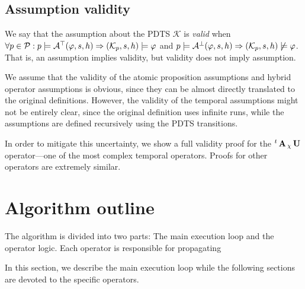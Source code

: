 \subsection{Assumption validity}

We say that the assumption about the \ac{PDTS} $\mathcal{K}$ is \emph{valid} when $\forall p \in \mathcal{P} : p \models \mathcal{A}^\top(\varphi, s, h) \Rightarrow (\mathcal{K}_p, s, h) \models \varphi$ and $ p \models \mathcal{A}^\bot(\varphi, s, h) \Rightarrow (\mathcal{K}_p, s, h) \not\models \varphi$. That is, an assumption implies validity, but validity does not imply assumption.

We assume that the validity of the atomic proposition assumptions and hybrid operator assumptions is obvious, since they can be almost directly translated to the original definitions. However, the validity of the temporal assumptions might not be entirely clear, since the original definition uses infinite runs, while the assumptions are defined recursively using the \ac{PDTS} transitions.

In order to mitigate this uncertainty, we show a full validity proof for the ${}^{t}\operatorname{\mathbf{A}}{}_{\chi}\operatorname{\mathbf{U}}$ operator—one of the most complex temporal operators. Proofs for other operators are extremely similar.





\section{Algorithm outline}

The algorithm is divided into two parts: The main execution loop and the operator logic. Each operator is responsible for propagating 

In this section, we describe the main execution loop while the following sections are devoted to the specific operators.

